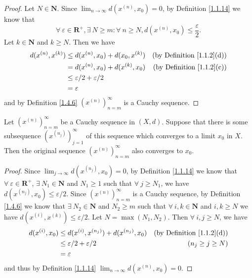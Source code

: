 \begin{proof}
    Let \(N \in \mathbf{N}\).
    Since \(\lim_{n \to \infty} d(x^{(n)}, x_0) = 0\), by Definition \ref{1.1.14} we know that
    \[
        \forall\ \varepsilon \in \mathbf{R}^+, \exists\ N \geq m : \forall\ n \geq N, d(x^{(n)}, x_0) \leq \frac{\varepsilon}{2}.
    \]
    Let \(k \in \mathbf{N}\) and \(k \geq N\).
    Then we have
    \begin{align*}
        d(x^{(n)}, x^{(k)}) & \leq d(x^{(n)}, x_0) + d(x_0, x^{(k)}) & \text{(by Definition \ref{1.1.2}(d))} \\
                            & = d(x^{(n)}, x_0) + d(x^{(k)}, x_0)    & \text{(by Definition \ref{1.1.2}(c))} \\
                            & \leq \varepsilon / 2 + \varepsilon / 2                                         \\
                            & = \varepsilon
    \end{align*}
    and by Definition \ref{1.4.6} \((x^{(n)})_{n = m}^\infty\) is a Cauchy sequence.
\end{proof}

\setcounter{theorem}{8}
\begin{lemma}\label{1.4.9}
    Let \((x^{(n)})_{n = m}^\infty\) be a Cauchy sequence in \((X, d)\).
    Suppose that there is some subsequence \((x^{(n_j)})_{j = 1}^\infty\) of this sequence which converges to a limit \(x_0\) in \(X\).
    Then the original sequence \((x^{(n)})_{n = m}^\infty\) also converges to \(x_0\).
\end{lemma}

\begin{proof}
    Since \(\lim_{j \to \infty} d(x^{(n_j)}, x_0) = 0\), by Definition \ref{1.1.14} we know that \(\forall\ \varepsilon \in \mathbf{R}^+\), \(\exists\ N_1 \in \mathbf{N}\) and \(N_1 \geq 1\) such that \(\forall\ j \geq N_1\), we have \(d(x^{(n_j)}, x_0) \leq \varepsilon / 2\).
    Since \((x^{(n)})_{n = m}^\infty\) is a Cauchy sequence, by Definition \ref{1.4.6} we know that \(\exists\ N_2 \in \mathbf{N}\) and \(N_2 \geq m\) such that \(\forall\ i, k \in \mathbf{N}\) and \(i, k \geq N\) we have \(d(x^{(i)}, x^{(k)}) \leq \varepsilon / 2\).
    Let \(N = \max(N_1, N_2)\).
    Then \(\forall\ i, j \geq N\), we have
    \begin{align*}
        d(x^{(i)}, x_0) & \leq d(x^{(i)}, x^{(n_j)}) + d(x^{(n_j)}, x_0) & \text{(by Definition \ref{1.1.2}(d))} \\
                        & \leq \varepsilon / 2 + \varepsilon / 2         & (n_j \geq j \geq N)                   \\
                        & = \varepsilon
    \end{align*}
    and thus by Definition \ref{1.1.14} \(\lim_{n \to \infty} d(x^{(n)}, x_0) = 0\).
\end{proof}


